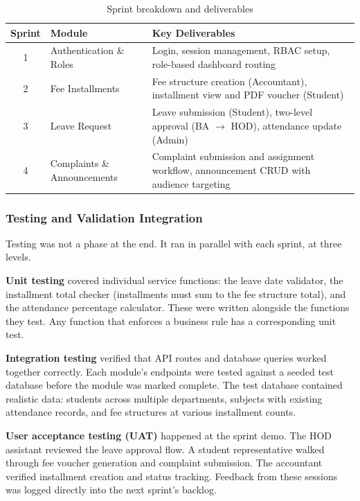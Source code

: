 \begin{table}[H]
\centering
\caption{Sprint breakdown and deliverables}
\begin{tabular}{|c|l|p{7cm}|}
\hline
\textbf{Sprint} & \textbf{Module} & \textbf{Key Deliverables} \\
\hline
1 & Authentication \& Roles &
 Login, session management, RBAC setup, role-based dashboard routing \\
\hline
2 & Fee Installments &
 Fee structure creation (Accountant), installment view and PDF voucher (Student) \\
\hline
3 & Leave Request &
 Leave submission (Student), two-level approval (BA $\to$ HOD), attendance update (Admin) \\
\hline
4 & Complaints \& Announcements &
 Complaint submission and assignment workflow, announcement CRUD with audience targeting \\
\hline
\end{tabular}
\end{table}


\subsubsection{Testing and Validation Integration}

Testing was not a phase at the end. It ran in parallel with each sprint, at three
levels.

\textbf{Unit testing} covered individual service functions: the leave date validator,
the installment total checker (installments must sum to the fee structure total), and
the attendance percentage calculator. These were written alongside the functions they
test. Any function that enforces a business rule has a corresponding unit test.

\textbf{Integration testing} verified that API routes and database queries worked
together correctly. Each module's endpoints were tested against a seeded test database
before the module was marked complete. The test database contained realistic data:
students across multiple departments, subjects with existing attendance records, and
fee structures at various installment counts.

\textbf{User acceptance testing (UAT)} happened at the sprint demo. The HOD assistant
reviewed the leave approval flow. A student representative walked through fee voucher
generation and complaint submission. The accountant verified installment creation and
status tracking. Feedback from these sessions was logged directly into the next
sprint's backlog.

